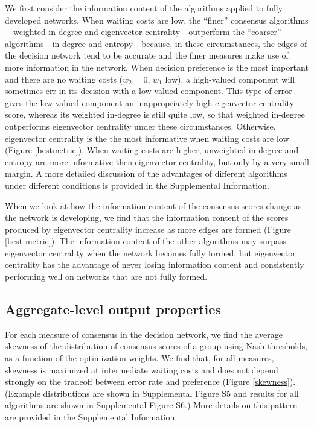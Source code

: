 \documentclass{pnastwo}
\begin{document}
\begin{article}
We first consider the information content of the algorithms applied to fully developed networks. When waiting costs are low, the ``finer'' consensus algorithms---weighted in-degree and eigenvector centrality---outperform the ``coarser'' algorithms---in-degree and entropy---because, in these circumstances, the edges of the decision network tend to be accurate and the finer measures make use of more information in the network. When decision preference is the most important and there are no waiting costs ($w_2=0$, $w_1$ low), a high-valued component will sometimes err in its decision with a low-valued component. This  type of error gives the low-valued component an inappropriately high eigenvector centrality score, whereas its weighted in-degree is still quite low, so that weighted in-degree outperforms eigenvector centrality under these circumstances. Otherwise, eigenvector centrality is the the most informative when waiting costs are low (Figure \ref{bestmetric}). When waiting costs are higher, unweighted in-degree and entropy are more informative then eigenvector centrality, but only by a very small margin. A more detailed discussion of the advantages of different algorithms under different conditions is provided in the Supplemental Information.

When we look at how the information content of the consensus scores change as the network is developing, we find that the information content of the scores produced by eigenvector centrality increase as more edges are formed (Figure \ref{best metric}). The information content of the other algorithms may surpass eigenvector centrality when the network becomes fully formed, but eigenvector centrality has the advantage of never losing information content and consistently performing well on networks that are not fully formed.


\subsection{Aggregate-level output properties}
For each measure of consensus in the decision network, we find the average skewness of the distribution of consensus scores of a group using Nash thresholds, as a function of the optimization weights. We find that, for all measures, skewness is maximized at intermediate waiting costs and does not depend strongly on the tradeoff between error rate and preference (Figure \ref{skewness}). (Example distributions are shown in Supplemental Figure S5 and results for all algorithms are shown in Supplemental Figure S6.)  More details on this pattern are provided in the Supplemental Information. 


\end{article}
\end{document}
